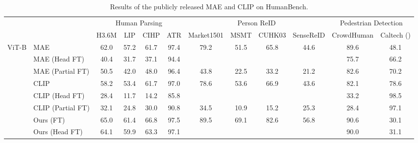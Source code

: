 \documentclass[10pt,twocolumn,letterpaper]{article}
\begin{document}
\begin{table*}[t]
  \scriptsize
  \centering
  \caption{Results of the publicly released MAE and CLIP on HumanBench.}
    \begin{tabular}{cl|cccccccccc}
    \toprule
          &       & \multicolumn{4}{c}{Human Parsing} & \multicolumn{4}{c}{Person ReID} & \multicolumn{2}{c}{Pedestrian  Detection} \\
\cmidrule{3-12}          &       & H3.6M & LIP   & CIHP  & \cellcolor[rgb]{ .949,  .949,  .949} ATR & Market1501 & MSMT  & CUHK03 & \cellcolor[rgb]{ .949,  .949,  .949} SenseReID & CrowdHuman & \cellcolor[rgb]{ .949,  .949,  .949} Caltech () \\
    \midrule
    \multirow{9}[6]{*}{ViT-B} & MAE   & 62.0  & 57.2  & 61.7  & \cellcolor[rgb]{ .949,  .949,  .949} 97.4  & 79.2  & 51.5  & 65.8  & \cellcolor[rgb]{ .949,  .949,  .949} 44.6  & 89.6  & \cellcolor[rgb]{ .949,  .949,  .949} 48.1  \\
          & MAE (Head FT) & 40.4  & 31.7  & 37.1  & \cellcolor[rgb]{ .949,  .949,  .949} 94.4  &    &    &    &    & 75.7  & \cellcolor[rgb]{ .949,  .949,  .949} 66.2  \\
          & MAE (Partial FT) & 50.5  & 42.0  & 48.0  & \cellcolor[rgb]{ .949,  .949,  .949} 96.4  & 43.8  & 22.5  & 33.2  & \cellcolor[rgb]{ .949,  .949,  .949} 21.2  & 82.6  & \cellcolor[rgb]{ .949,  .949,  .949} 70.2  \\
\cmidrule{2-12}          & CLIP  & 58.2  & 53.4  & 61.7  & \cellcolor[rgb]{ .949,  .949,  .949} 97.0  & 78.6  & 53.6  & 66.9  & \cellcolor[rgb]{ .949,  .949,  .949} 43.6  & 82.1  & \cellcolor[rgb]{ .949,  .949,  .949} 78.6  \\
          & CLIP (Head FT) & 28.4  & 11.7  & 14.2  & \cellcolor[rgb]{ .949,  .949,  .949} 85.8  &    &    &    &    & 33.2  & \cellcolor[rgb]{ .949,  .949,  .949} 98.5  \\
          & CLIP (Partial FT) & 32.1  & 24.8  & 30.0  & \cellcolor[rgb]{ .949,  .949,  .949} 90.8  & 34.5  & 10.9  & 15.2  & \cellcolor[rgb]{ .949,  .949,  .949}25.3  & 28.4  & \cellcolor[rgb]{ .949,  .949,  .949} 97.1  \\
\cmidrule{2-12}          & Ours (FT) & 65.0  & 61.4  & 66.8  & \cellcolor[rgb]{ .949,  .949,  .949} 97.5  & 89.5  & 69.1  & 82.6  & \cellcolor[rgb]{ .949,  .949,  .949} 56.8  & 90.6  & \cellcolor[rgb]{ .949,  .949,  .949} 30.1  \\
          & Ours (Head FT) & 64.1  & 59.9  & 63.3  & \cellcolor[rgb]{ .949,  .949,  .949} 97.1  &    &    &    & \cellcolor[rgb]{ .949,  .949,  .949}  & 90.0  & \cellcolor[rgb]{ .949,  .949,  .949} 31.1  \\

\end{tabular}
\end{table*}
\end{document}
